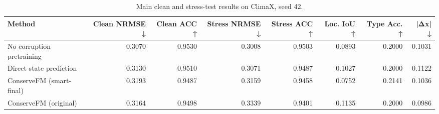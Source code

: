 \begin{table}
\caption{Main clean and stress-test results on ClimaX, seed 42.}
\label{tab:main_results}
\begin{tabular}{lrrrrrrr}
\toprule
Method & Clean NRMSE ↓ & Clean ACC ↑ & Stress NRMSE ↓ & Stress ACC ↑ & Loc. IoU ↑ & Type Acc. ↑ & |Δx| ↓ \\
\midrule
No corruption pretraining & 0.3070 & 0.9530 & 0.3008 & 0.9503 & 0.0893 & 0.2000 & 0.1031 \\
Direct state prediction & 0.3130 & 0.9510 & 0.3071 & 0.9487 & 0.1027 & 0.2000 & 0.1122 \\
ConserveFM (smart-final) & 0.3193 & 0.9487 & 0.3159 & 0.9458 & 0.0752 & 0.2141 & 0.1036 \\
ConserveFM (original) & 0.3164 & 0.9498 & 0.3339 & 0.9401 & 0.1135 & 0.2000 & 0.0986 \\
\bottomrule
\end{tabular}
\end{table}
